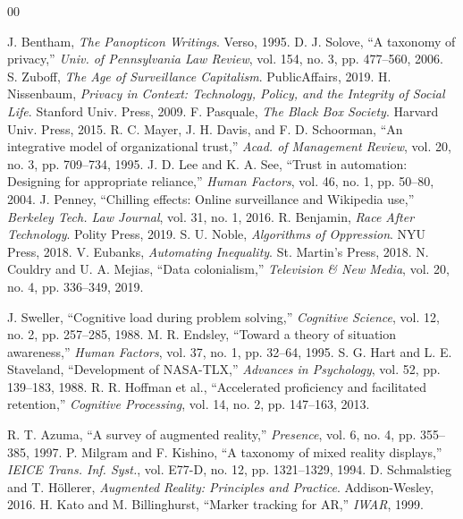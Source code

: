 \documentclass[conference]{IEEEtran}
\begin{document}
\begin{thebibliography}{00}

 J. Bentham, \textit{The Panopticon Writings}. Verso, 1995.
 D. J. Solove, ``A taxonomy of privacy,'' \textit{Univ. of Pennsylvania Law Review}, vol. 154, no. 3, pp. 477--560, 2006.
 S. Zuboff, \textit{The Age of Surveillance Capitalism}. PublicAffairs, 2019.
 H. Nissenbaum, \textit{Privacy in Context: Technology, Policy, and the Integrity of Social Life}. Stanford Univ. Press, 2009.
 F. Pasquale, \textit{The Black Box Society}. Harvard Univ. Press, 2015.
 R. C. Mayer, J. H. Davis, and F. D. Schoorman, ``An integrative model of organizational trust,'' \textit{Acad. of Management Review}, vol. 20, no. 3, pp. 709--734, 1995.
 J. D. Lee and K. A. See, ``Trust in automation: Designing for appropriate reliance,'' \textit{Human Factors}, vol. 46, no. 1, pp. 50--80, 2004.
 J. Penney, ``Chilling effects: Online surveillance and Wikipedia use,'' \textit{Berkeley Tech. Law Journal}, vol. 31, no. 1, 2016.
 R. Benjamin, \textit{Race After Technology}. Polity Press, 2019.
 S. U. Noble, \textit{Algorithms of Oppression}. NYU Press, 2018.
 V. Eubanks, \textit{Automating Inequality}. St. Martin's Press, 2018.
 N. Couldry and U. A. Mejias, ``Data colonialism,'' \textit{Television \& New Media}, vol. 20, no. 4, pp. 336--349, 2019.

 J. Sweller, ``Cognitive load during problem solving,'' \textit{Cognitive Science}, vol. 12, no. 2, pp. 257--285, 1988.
 M. R. Endsley, ``Toward a theory of situation awareness,'' \textit{Human Factors}, vol. 37, no. 1, pp. 32--64, 1995.
 S. G. Hart and L. E. Staveland, ``Development of NASA-TLX,'' \textit{Advances in Psychology}, vol. 52, pp. 139--183, 1988.
 R. R. Hoffman et al., ``Accelerated proficiency and facilitated retention,'' \textit{Cognitive Processing}, vol. 14, no. 2, pp. 147--163, 2013.

 R. T. Azuma, ``A survey of augmented reality,'' \textit{Presence}, vol. 6, no. 4, pp. 355--385, 1997.
 P. Milgram and F. Kishino, ``A taxonomy of mixed reality displays,'' \textit{IEICE Trans. Inf. Syst.}, vol. E77-D, no. 12, pp. 1321--1329, 1994.
 D. Schmalstieg and T. H\"ollerer, \textit{Augmented Reality: Principles and Practice}. Addison-Wesley, 2016.
 H. Kato and M. Billinghurst, ``Marker tracking for AR,'' \textit{IWAR}, 1999.


\end{thebibliography}
\end{document}

